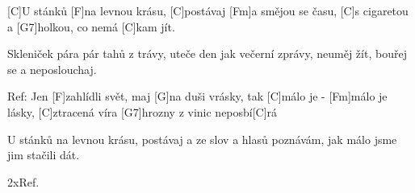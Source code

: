 
[C]U stánků [F]na levnou krásu, 
[C]postávaj [Fm]a smějou se času,
[C]s cigaretou a [G7]holkou, co nemá [C]kam jít.

Skleniček pára pár tahů z trávy, 
uteče den jak večerní zprávy,
neuměj žít, bouřej se a neposlouchaj.

Ref:
Jen [F]zahlídli svět, maj [G]na duši vrásky,
tak [C]málo je - [Fm]málo je lásky,
[C]ztracená víra [G7]hrozny z vinic neposbí[C]rá

U stánků na levnou krásu, 
postávaj a ze slov a hlasů
poznávám, jak málo jsme jim stačili dát.

2xRef.